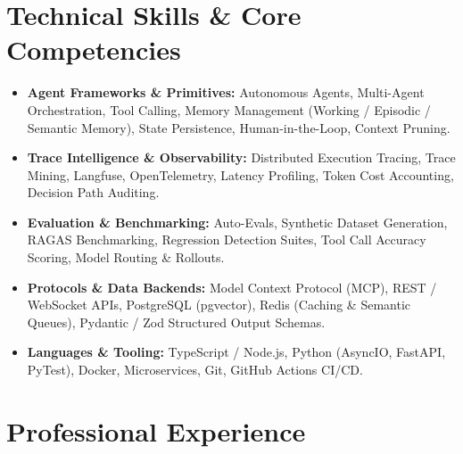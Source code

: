 \documentclass[a4paper,10pt]{article}
\begin{document}
\section{Technical Skills \& Core Competencies}
\begin{itemize}[leftmargin=1.2em, itemsep=2pt]
  \item \textbf{Agent Frameworks \& Primitives:} Autonomous Agents, Multi-Agent Orchestration, Tool Calling, Memory Management (Working / Episodic / Semantic Memory), State Persistence, Human-in-the-Loop, Context Pruning.
  \item \textbf{Trace Intelligence \& Observability:} Distributed Execution Tracing, Trace Mining, Langfuse, OpenTelemetry, Latency Profiling, Token Cost Accounting, Decision Path Auditing.
  \item \textbf{Evaluation \& Benchmarking:} Auto-Evals, Synthetic Dataset Generation, RAGAS Benchmarking, Regression Detection Suites, Tool Call Accuracy Scoring, Model Routing \& Rollouts.
  \item \textbf{Protocols \& Data Backends:} Model Context Protocol (MCP), REST / WebSocket APIs, PostgreSQL (pgvector), Redis (Caching \& Semantic Queues), Pydantic / Zod Structured Output Schemas.
  \item \textbf{Languages \& Tooling:} TypeScript / Node.js, Python (AsyncIO, FastAPI, PyTest), Docker, Microservices, Git, GitHub Actions CI/CD.
\end{itemize}

\section{Professional Experience}
\end{document}
